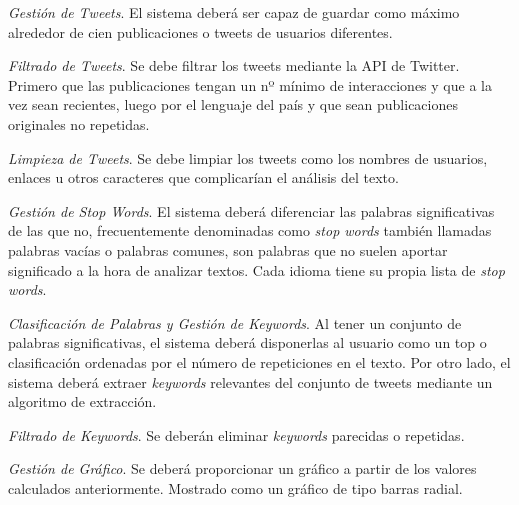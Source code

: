 \begin{enumerate}
{    \textit{Gestión de Tweets}. El sistema deberá ser capaz de guardar como máximo alrededor de cien publicaciones o tweets de usuarios diferentes.
    \begin{enumerate}{\renewcommand{\labelenumii}{R.F. \arabic{enumi}.\arabic{enumii}}
        \item
        \textit{Filtrado de Tweets}. Se debe filtrar los tweets mediante la API de Twitter. Primero que las publicaciones tengan un nº mínimo de interacciones y que a la vez sean recientes, luego por el lenguaje del país y que sean publicaciones originales no repetidas.
        \item
        \textit{Limpieza de Tweets}. Se debe limpiar los tweets como los nombres de usuarios, enlaces u otros caracteres que complicarían el análisis del texto.
        \begin{enumerate}{\renewcommand{\labelenumiii}{R.F. \arabic{enumi}.\arabic{enumii}.\arabic{enumiii}}
            \item
            \textit{Gestión de Stop Words}. El sistema deberá diferenciar las palabras significativas de las que no, frecuentemente denominadas como \textit{stop words} también llamadas palabras vacías o palabras comunes, son palabras que no suelen aportar significado a la hora de analizar textos. Cada idioma tiene su propia lista de \textit{stop words}.
            }\end{enumerate}
        }\end{enumerate}
        \item
        \textit{Clasificación de Palabras y Gestión de Keywords}. Al tener un conjunto de palabras significativas, el sistema deberá disponerlas al usuario como un top o clasificación ordenadas por el número de repeticiones en el texto. Por otro lado, el sistema deberá extraer \textit{keywords} relevantes del conjunto de tweets mediante un algoritmo de extracción.
        \begin{enumerate}{\renewcommand{\labelenumii}{R.F. \arabic{enumi}.\arabic{enumii}}
            \item
            \textit{Filtrado de Keywords}. Se deberán eliminar \textit{keywords} parecidas o repetidas.
            \item
            \textit{Gestión de Gráfico}. Se deberá proporcionar un gráfico a partir de los valores calculados anteriormente. Mostrado como un gráfico de tipo barras radial.
            \begin{enumerate}{\renewcommand{\labelenumiii}{R.F. \arabic{enumi}.\arabic{enumii}.\arabic{enumiii}}
}
\end{enumerate}}
\end{enumerate}}
\end{enumerate}
